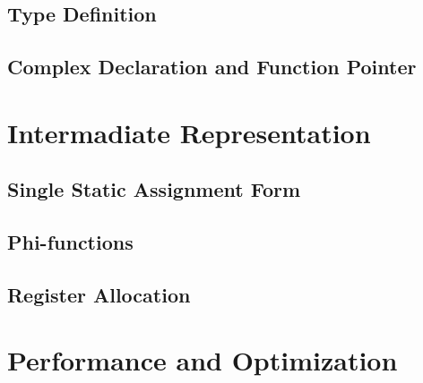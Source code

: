 \documentclass[10pt, a4paper]{article}
\begin{document}
\subsection{Type Definition}
\subsection{Complex Declaration and Function Pointer}
\section{Intermadiate Representation}
\subsection{Single Static Assignment Form}
\subsection{Phi-functions}
\subsection{Register Allocation}
\section{Performance and Optimization}
\end{document}
